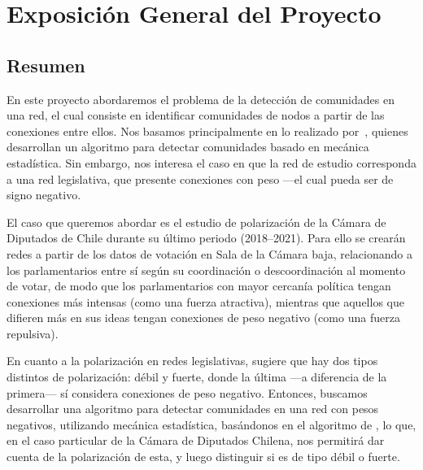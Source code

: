 \documentclass[hyperref]{proyectotesis}
\begin{document}
\newpage

\section{Exposición General del Proyecto}
\subsection{Resumen}
En este proyecto abordaremos el problema de la detección de comunidades en una red, el cual consiste en identificar comunidades de nodos a partir de las conexiones entre ellos. Nos basamos principalmente en lo realizado por~\citet{reichardt_statistical_2006}, quienes desarrollan un algoritmo para detectar comunidades basado en mecánica estadística. Sin embargo, nos interesa el caso en que la red de estudio corresponda a una red legislativa, que presente conexiones con peso ---el cual pueda ser de signo negativo.

El caso que queremos abordar es el estudio de polarización de la Cámara de Diputados de Chile durante su último periodo (2018--2021). Para ello se crearán redes a partir de los datos de votación en Sala de la Cámara baja, relacionando a los parlamentarios entre sí según su coordinación o descoordinación al momento de votar, de modo que los parlamentarios con mayor cercanía política tengan conexiones más intensas (como una fuerza atractiva), mientras que aquellos que difieren más en sus ideas tengan conexiones de peso negativo (como una fuerza repulsiva). 

En cuanto a la polarización en redes legislativas, \citet{neal_sign_2020} sugiere que hay dos tipos distintos de polarización: débil y fuerte, donde la última ---a diferencia de la primera--- sí considera conexiones de peso negativo. 
Entonces, buscamos desarrollar una algoritmo para detectar comunidades en una red con pesos negativos, utilizando mecánica estadística, basándonos en el algoritmo de \citet{reichardt_statistical_2006}, lo que, en el caso particular de la Cámara de Diputados Chilena, nos permitirá dar cuenta de la polarización de esta, y luego distinguir si es de tipo débil o fuerte.
\end{document}
